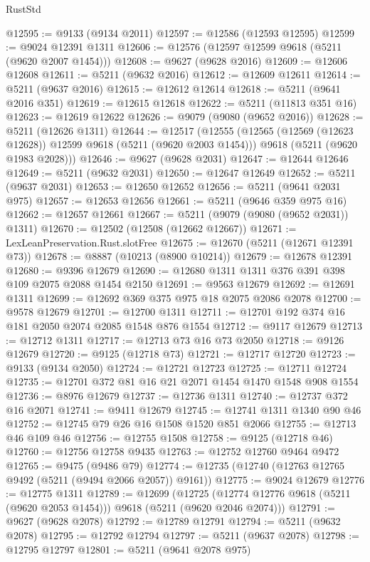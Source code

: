 \begin{lexlean}{RustStd}
\begin{coremodule}
@12595 := @9133 (@9134 @2011)
@12597 := @12586 (@12593 @12595)
@12599 := @9024 @12391 @1311
@12606 := @12576 (@12597 @12599 @9618 (@5211 (@9620 @2007 @1454)))
@12608 := @9627 (@9628 @2016)
@12609 := @12606 @12608
@12611 := @5211 (@9632 @2016)
@12612 := @12609 @12611
@12614 := @5211 (@9637 @2016)
@12615 := @12612 @12614
@12618 := @5211 (@9641 @2016 @351)
@12619 := @12615 @12618
@12622 := @5211 (@11813 @351 @16)
@12623 := @12619 @12622
@12626 := @9079 (@9080 (@9652 @2016))
@12628 := @5211 (@12626 @1311)
@12644 := @12517
    (@12555
      (@12565 (@12569 (@12623 @12628)) @12599 @9618 (@5211 (@9620 @2003 @1454)))
      @9618
      (@5211 (@9620 @1983 @2028)))
@12646 := @9627 (@9628 @2031)
@12647 := @12644 @12646
@12649 := @5211 (@9632 @2031)
@12650 := @12647 @12649
@12652 := @5211 (@9637 @2031)
@12653 := @12650 @12652
@12656 := @5211 (@9641 @2031 @975)
@12657 := @12653 @12656
@12661 := @5211 (@9646 @359 @975 @16)
@12662 := @12657 @12661
@12667 := @5211 (@9079 (@9080 (@9652 @2031)) @1311)
@12670 := @12502 (@12508 (@12662 @12667))
@12671 := LexLeanPreservation.Rust.slotFree
@12675 := @12670 (@5211 (@12671 @12391 @73))
@12678 := @8887 (@10213 (@8900 @10214))
@12679 := @12678 @12391
@12680 := @9396 @12679
@12690 := @12680 @1311 @1311 @376 @391 @398 @109 @2075 @2088 @1454 @2150
@12691 := @9563 @12679
@12692 := @12691 @1311
@12699 := @12692 @369 @375 @975 @18 @2075 @2086 @2078
@12700 := @9578 @12679
@12701 := @12700 @1311
@12711 := @12701 @192 @374 @16 @181 @2050 @2074 @2085 @1548 @876 @1554
@12712 := @9117 @12679
@12713 := @12712 @1311
@12717 := @12713 @73 @16 @73 @2050
@12718 := @9126 @12679
@12720 := @9125 (@12718 @73)
@12721 := @12717 @12720
@12723 := @9133 (@9134 @2050)
@12724 := @12721 @12723
@12725 := @12711 @12724
@12735 := @12701 @372 @81 @16 @21 @2071 @1454 @1470 @1548 @908 @1554
@12736 := @8976 @12679
@12737 := @12736 @1311
@12740 := @12737 @372 @16 @2071
@12741 := @9411 @12679
@12745 := @12741 @1311 @1340 @90 @46
@12752 := @12745 @79 @26 @16 @1508 @1520 @851 @2066
@12755 := @12713 @46 @109 @46
@12756 := @12755 @1508
@12758 := @9125 (@12718 @46)
@12760 := @12756 @12758 @9435
@12763 := @12752 @12760 @9464 @9472
@12765 := @9475 (@9486 @79)
@12774 := @12735 (@12740 (@12763 @12765 @9492 (@5211 (@9494 @2066 @2057)) @9161))
@12775 := @9024 @12679
@12776 := @12775 @1311
@12789 := @12699
    (@12725 (@12774 @12776 @9618 (@5211 (@9620 @2053 @1454))) @9618 (@5211 (@9620 @2046 @2074)))
@12791 := @9627 (@9628 @2078)
@12792 := @12789 @12791
@12794 := @5211 (@9632 @2078)
@12795 := @12792 @12794
@12797 := @5211 (@9637 @2078)
@12798 := @12795 @12797
@12801 := @5211 (@9641 @2078 @975)

\end{coremodule}
\end{lexlean}
